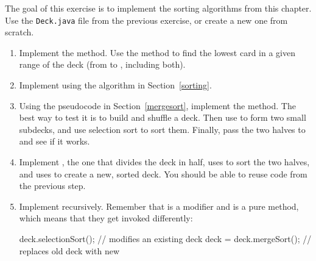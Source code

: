 \begin{exercise}  %

The goal of this exercise is to implement the sorting algorithms from this chapter.
Use the {\tt Deck.java} file from the previous exercise, or create a new one from scratch.

\begin{enumerate}

\item Implement the  method.
Use the  method to find the lowest card in a given range of the deck (from  to , including both).

\item Implement  using the algorithm in Section~\ref{sorting}.

\item Using the pseudocode in Section~\ref{mergesort}, implement the  method.
The best way to test it is to build and shuffle a deck.
Then use  to form two small subdecks, and use selection sort to sort them.
Finally, pass the two halves to  and see if it works.

\item Implement , the one that divides the deck in half, uses  to sort the two halves, and uses  to create a new, sorted deck.
You should be able to reuse code from the previous step.

\item Implement  recursively.
Remember that  is a modifier and  is a pure method, which means that they get invoked differently:

\begin{code}
deck.selectionSort();      // modifies an existing deck
deck = deck.mergeSort();   // replaces old deck with new
\end{code}

\end{enumerate}

\end{exercise}


